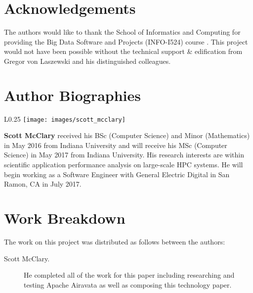 \documentclass[9pt,twocolumn,twoside]{../../styles/osajnl}
\begin{document}
\section*{Acknowledgements}
The authors would like to thank the School of Informatics and
Computing for providing the Big Data Software and Projects (INFO-I524)
course \cite{www-i524}. This project would not have been possible
without the technical support \& edification from Gregor von Laszewski
and his distinguished colleagues.

 
\section*{Author Biographies}
\begingroup
\setlength\intextsep{0pt}
\begin{minipage}[t][3.2cm][t]{1.0\columnwidth} 
  \begin{wrapfigure}{L}{0.25\columnwidth}
    \texttt{[image: images/scott\_mcclary]}
  \end{wrapfigure}
  \noindent
  {\bfseries Scott McClary} received his BSc (Computer Science) and
  Minor (Mathematics) in May 2016 from Indiana University and will
  receive his MSc (Computer Science) in May 2017 from Indiana
  University. His research interests are within scientific application
  performance analysis on large-scale HPC systems. He will begin
  working as a Software Engineer with General Electric Digital in San
  Ramon, CA in July 2017.
\end{minipage}
\endgroup

\section*{} %
\section*{Work Breakdown}
The work on this project was distributed as follows between the
authors:
\begin{description}
\item[Scott McClary.] He completed all of the work for this paper
  including researching and testing Apache Airavata as well as
  composing this technology paper.
\end{description}


\end{document}
